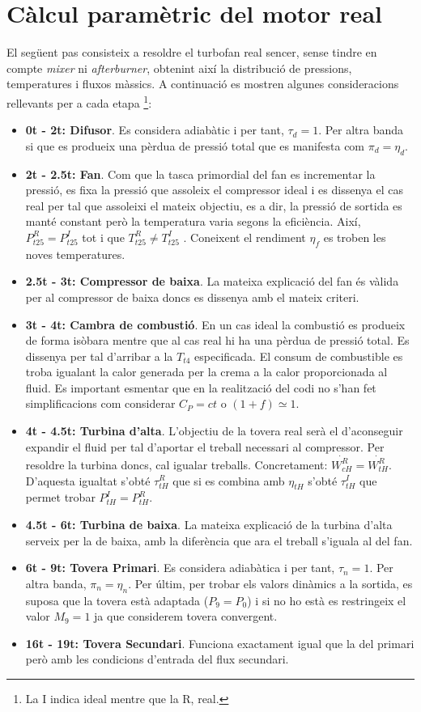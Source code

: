\section{Càlcul paramètric del motor real}
\label{motoreal}
El següent pas consisteix a resoldre el turbofan real sencer, sense tindre en compte \textit{mixer} ni \textit{afterburner}, obtenint així la distribució de pressions, temperatures i fluxos màssics. A continuació es mostren algunes consideracions rellevants per a cada etapa \footnote{La I indica ideal mentre que la R, real.}:
\begin{itemize}
\item \textbf{0t - 2t: Difusor}. Es considera adiabàtic i per tant, $\tau_d = 1$. Per altra banda si que es produeix una pèrdua de pressió total que es manifesta com $\pi_d = \eta_d$.
\item \textbf{2t - 2.5t: Fan}. Com que la tasca primordial del fan es incrementar la pressió, es fixa la pressió que assoleix el compressor ideal i es dissenya el cas real per tal que assoleixi el mateix objectiu, es a dir, la pressió de sortida es manté constant però la temperatura varia segons la eficiència. Així, $P_{t25}^R = P_{t25}^I$ tot i que $T_{t25}^R \neq T_{t25}^I$ . Coneixent el rendiment $\eta_f$ es troben les noves temperatures.
\item \textbf{2.5t - 3t: Compressor de baixa}. La mateixa explicació del fan és vàlida per al compressor de baixa doncs es dissenya amb el mateix criteri.
\item \textbf{3t - 4t: Cambra de combustió}. En un cas ideal la combustió es produeix de forma isòbara mentre que al cas real hi ha una pèrdua de pressió total. Es dissenya per tal d'arribar a la $T_{t4}$ especificada. El consum de combustible es troba igualant la calor generada per la crema a la calor proporcionada al fluid. Es important esmentar que en la realització del codi no s'han fet simplificacions com considerar $C_P=ct$ o $(1+f)\simeq1$.
\item \textbf{4t - 4.5t: Turbina d'alta}. L'objectiu de la tovera real serà el d'aconseguir expandir el fluid per tal d'aportar el treball necessari al compressor. Per resoldre la turbina doncs, cal igualar treballs. Concretament: $\dot{W_{cH}^R} = \dot{W_{tH}^R} $. D'aquesta igualtat s'obté $\tau_{tH}^R$ que si es combina amb $\eta_{tH}$ s'obté $\tau_{tH}^I$ que permet trobar  $P_{tH}^{I} = P_{tH}^{R}$.
\item \textbf{4.5t - 6t: Turbina de baixa}. La mateixa explicació de la turbina d'alta serveix per la de baixa, amb la diferència que ara el treball s'iguala al del fan.
\item \textbf{6t - 9t: Tovera Primari}. Es considera adiabàtica i per tant, $\tau_n = 1$. Per altra banda, $\pi_n = \eta_n$. Per últim, per trobar els valors dinàmics a la sortida, es suposa que la tovera està adaptada ($P_9 = P_0$) i si no ho està es restringeix el valor $M_9=1$ ja que considerem tovera convergent.
\item \textbf{16t - 19t: Tovera Secundari}. Funciona exactament igual que la del primari però amb les condicions d'entrada del flux secundari.
\end{itemize}
